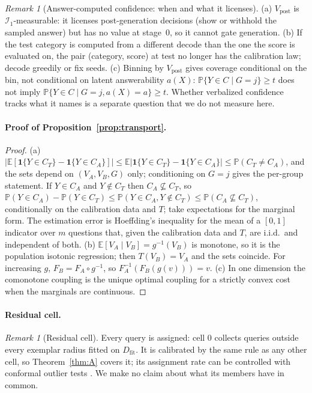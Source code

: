 \documentclass[twoside]{article}
\theoremstyle{definition}
\theoremstyle{remark}
\newtheorem{remark}[theorem]{Remark}
\newcommand{\Dfit}{D_{\mathrm{fit}}}
\newcommand{\Info}{\mathcal{I}}
\newcommand{\E}{\mathbb{E}}
\renewcommand{\P}{\mathbb{P}}
\newcommand{\1}{\mathbf{1}}
\begin{document}
\begin{remark}[Answer-computed confidence: when and what it licenses]
\label{rem:vc}
(a) $V_{\mathrm{post}}$ is $\Info_1$-measurable: it licenses post-generation decisions
(show or withhold the sampled answer) but has no value at stage~$0$, so it cannot gate
generation. (b) If the test category is computed from a different decode than the one the
score is evaluated on, the pair (category, score) at test no longer has the calibration law;
decode greedily or fix seeds. (c) Binning by
$V_{\mathrm{post}}$ gives coverage conditional on the bin, not conditional on latent
answerability $a(X)$: $\P\{Y\in C\mid G=j\}\ge t$ does not imply
$\P\{Y\in C\mid G=j, a(X)=a\}\ge t$. Whether verbalized confidence tracks what it names is a separate
question that we do not measure here.
\end{remark}

\paragraph{Proof of Proposition~\ref{prop:transport}.}
\begin{proof}
(a) $|\E[\1\{Y\in C_T\}-\1\{Y\in C_A\}]|\le\E|\1\{Y\in C_T\}-\1\{Y\in C_A\}|\le\P(C_T\neq C_A)$, and the sets
depend on $(V_A,V_B,G)$ only; conditioning on $G=j$ gives the per-group statement. If $Y\in C_A$ and
$Y\notin C_T$ then $C_A\not\subseteq C_T$, so $\P(Y\in C_A)-\P(Y\in C_T)\le\P(Y\in C_A,Y\notin C_T)\le
\P(C_A\not\subseteq C_T)$, conditionally on the calibration data and $T$; take expectations for the marginal
form. The estimation error is Hoeffding's inequality for the mean of a $[0,1]$ indicator over $m$
questions that, given the calibration data and $T$, are i.i.d.\ and independent of both. (b)
$\E[V_A\mid V_B]=g^{-1}(V_B)$ is monotone, so it is the population isotonic regression; then
$T(V_B)=V_A$ and the sets coincide. For increasing $g$, $F_B=F_A\circ g^{-1}$, so
$F_A^{-1}(F_B(g(v)))=v$. (c) In one dimension the comonotone coupling is the unique optimal coupling for
a strictly convex cost when the marginals are continuous.
\end{proof}

\paragraph{Residual cell.}
\begin{remark}[Residual cell]
\label{prop:D}
Every query is assigned: cell 0 collects queries outside every exemplar radius fitted on $\Dfit$.
It is calibrated by the same rule as any other cell, so Theorem~\ref{thm:A} covers it; its
assignment rate can be controlled with conformal outlier tests
\citep{bates2023testing,guan2022bcops}. We make no claim about what its members have in common.
\end{remark}
\end{document}
